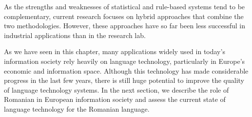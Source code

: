\begin{multicols}{2}

As the strengths and weaknesses of statistical and rule-based systems tend to be complementary, current research focuses on hybrid approaches that combine the two methodologies. However, these approaches have so far been less successful in industrial applications than in the research lab. 

As we have seen in this chapter, many applications widely used in today’s information society rely heavily on language technology, particularly in Europe’s economic and information space. Although this technology has made considerable progress in the last few years, there is still huge potential to improve the quality of language technology systems. In the next section, we describe the role of Romanian in European information society and assess the current state of language technology for the Romanian language.
\end{multicols}

\clearpage


